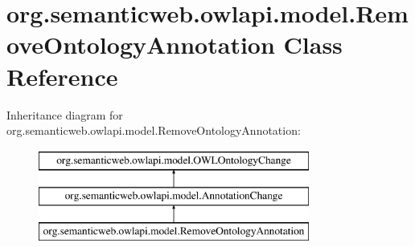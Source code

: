 \hypertarget{classorg_1_1semanticweb_1_1owlapi_1_1model_1_1_remove_ontology_annotation}{\section{org.\-semanticweb.\-owlapi.\-model.\-Remove\-Ontology\-Annotation Class Reference}
\label{classorg_1_1semanticweb_1_1owlapi_1_1model_1_1_remove_ontology_annotation}
}
Inheritance diagram for org.\-semanticweb.\-owlapi.\-model.\-Remove\-Ontology\-Annotation\-:\begin{figure}[H]
\begin{center}
\leavevmode
\includegraphics[height=3.000000cm]{classorg_1_1semanticweb_1_1owlapi_1_1model_1_1_remove_ontology_annotation}
\end{center}
\end{figure}
